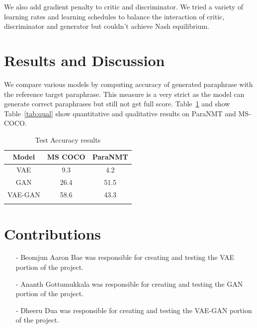 \documentclass{article}
\begin{document}
We also add gradient penalty to critic and discriminator. We tried a variety of learning rates and learning schedules to balance the interaction of critic, discriminator and generator but couldn't achieve Nash equilibrium. 

\section{Results and Discussion}
We compare various models by computing accuracy of generated paraphrase with the reference target paraphrase. This measure is a very strict as the model can generate correct paraphrases but still not get full score. Table~\ref{tab:quant} and show Table~\ref{tab:qual} show quantitative and qualitative  results on ParaNMT and MS-COCO.

\begin{table}
\centering
\small
\begin{tabular}{ccc}
    \toprule
     Model & MS COCO & ParaNMT  \\
     \midrule
     VAE & 9.3 & 4.2 \\
     GAN & 26.4 & 51.5 \\
     VAE-GAN & 58.6 & 43.3\\
     \bottomrule \\
\end{tabular}
\label{tab:quant}
\caption{Test Accuracy results}
\end{table}

 




\section{Contributions}
\begin{enumerate}
    \item[-] Beomjun Aaron Bae was responsible for creating and testing the VAE portion of the project.
    \item[-] Ananth Gottumukkala was responsible for creating and testing the GAN portion of the project.
    \item[-] Dheeru Dua was responsible for creating and testing the VAE-GAN portion of the project.
\end{enumerate}

\printbibliography
\end{document}
